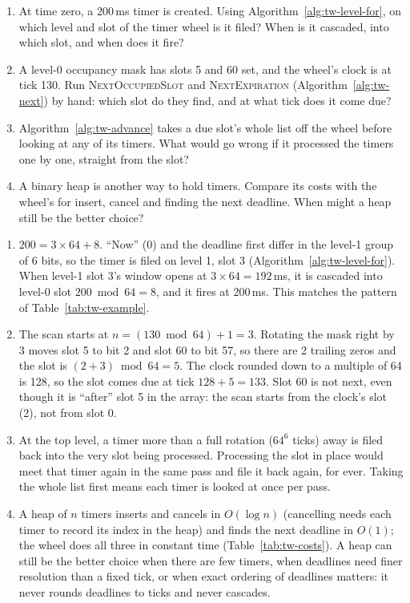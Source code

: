 \begin{Exercise}[title={Timing wheels}]
    \begin{enumerate}
        \item At time zero, a 200\,ms timer is created. Using Algorithm~\ref{alg:tw-level-for}, on which level and slot of the timer wheel is it filed? When is it cascaded, into which slot, and when does it fire?
        \item A level-0 occupancy mask has slots 5 and 60 set, and the wheel's clock is at tick 130. Run \textsc{NextOccupiedSlot} and \textsc{NextExpiration} (Algorithm~\ref{alg:tw-next}) by hand: which slot do they find, and at what tick does it come due?
        \item Algorithm~\ref{alg:tw-advance} takes a due slot's whole list off the wheel before looking at any of its timers. What would go wrong if it processed the timers one by one, straight from the slot?
        \item A binary heap is another way to hold timers. Compare its costs with the wheel's for insert, cancel and finding the next deadline. When might a heap still be the better choice?
    \end{enumerate}
\end{Exercise}
\begin{Answer}
    \begin{enumerate}
        \item $200 = 3 \times 64 + 8$. ``Now'' (0) and the deadline first differ in the level-1 group of 6 bits, so the timer is filed on level 1, slot 3 (Algorithm~\ref{alg:tw-level-for}). When level-1 slot 3's window opens at $3 \times 64 = 192$\,ms, it is cascaded into level-0 slot $200 \bmod 64 = 8$, and it fires at 200\,ms. This matches the pattern of Table~\ref{tab:tw-example}.
        \item The scan starts at $n = (130 \bmod 64) + 1 = 3$. Rotating the mask right by 3 moves slot 5 to bit 2 and slot 60 to bit 57, so there are 2 trailing zeros and the slot is $(2 + 3) \bmod 64 = 5$. The clock rounded down to a multiple of 64 is 128, so the slot comes due at tick $128 + 5 = 133$. Slot 60 is not next, even though it is ``after'' slot 5 in the array: the scan starts from the clock's slot (2), not from slot 0.
        \item At the top level, a timer more than a full rotation ($64^6$ ticks) away is filed back into the very slot being processed. Processing the slot in place would meet that timer again in the same pass and file it back again, for ever. Taking the whole list first means each timer is looked at once per pass.
        \item A heap of $n$ timers inserts and cancels in $O(\log n)$ (cancelling needs each timer to record its index in the heap) and finds the next deadline in $O(1)$; the wheel does all three in constant time (Table~\ref{tab:tw-costs}). A heap can still be the better choice when there are few timers, when deadlines need finer resolution than a fixed tick, or when exact ordering of deadlines matters: it never rounds deadlines to ticks and never cascades.
    \end{enumerate}
\end{Answer}
